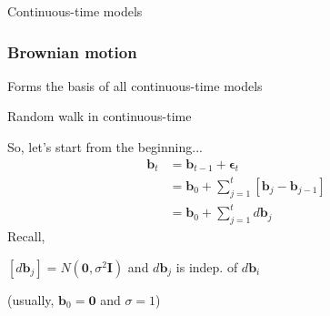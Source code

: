 \documentclass[36pt,handout]{beamer}
\newcommand{\ft}[1]{\frametitle{#1}}
\newcommand{\bb}{\mathbf{b}}
\newcommand{\be}{\boldsymbol{\epsilon}}
\begin{document}

{
\begin{frame}[t]
\end{frame}
}


{
\begin{frame}
\textcolor{noaaturq}{\Huge Continuous-time models}
\end{frame}
}


\begin{frame}
\ft{Brownian motion}
Forms the basis of all continuous-time models\medskip

Random walk in continuous-time \medskip

So, let's start from the beginning...
$$
\begin{aligned}
\bb_t &= \bb_{t-1} + \be_t \\
&= \bb_0 + \sum_{j=1}^{t}\left[\bb_j-\bb_{j-1}\right] \\
&= \bb_0 + \sum_{j=1}^{t} d\bb_j
\end{aligned}
$$
Recall,

$[d\bb_j] = N(\mathbf{0},\sigma^2\mathbf{I})$ and $d\bb_j$ is indep. of $d\bb_i$

(usually, $\bb_0 = \mathbf{0}$ and $\sigma=1$)

\end{frame}
\end{document}
